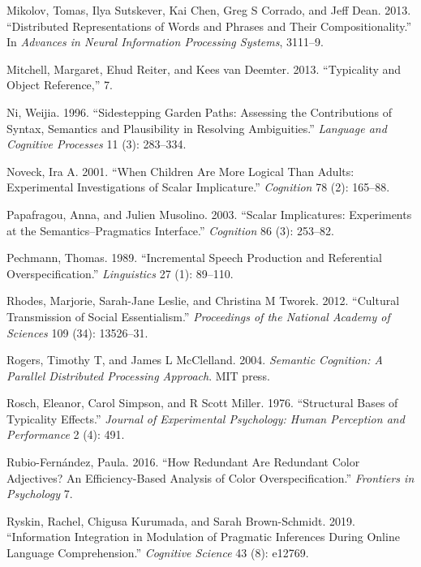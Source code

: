 \documentclass{ucetd}
\newlength{\cslhangindent}
\newenvironment{cslreferences}%
{\setlength{\parindent}{0pt}%
\everypar{\setlength{\hangindent}{\cslhangindent}}\ignorespaces}%
{\par}
\begin{document}
\begin{cslreferences}
\leavevmode\hypertarget{ref-mikolov2013}{}%
Mikolov, Tomas, Ilya Sutskever, Kai Chen, Greg S Corrado, and Jeff Dean.
2013. ``Distributed Representations of Words and Phrases and Their
Compositionality.'' In \emph{Advances in Neural Information Processing
Systems}, 3111--9.

\leavevmode\hypertarget{ref-mitchell_2013}{}%
Mitchell, Margaret, Ehud Reiter, and Kees van Deemter. 2013.
``Typicality and Object Reference,'' 7.

\leavevmode\hypertarget{ref-nietal}{}%
Ni, Weijia. 1996. ``Sidestepping Garden Paths: Assessing the
Contributions of Syntax, Semantics and Plausibility in Resolving
Ambiguities.'' \emph{Language and Cognitive Processes} 11 (3): 283--334.

\leavevmode\hypertarget{ref-noveck_when_2001}{}%
Noveck, Ira A. 2001. ``When Children Are More Logical Than Adults:
Experimental Investigations of Scalar Implicature.'' \emph{Cognition} 78
(2): 165--88.

\leavevmode\hypertarget{ref-papafragou_scalar_2003}{}%
Papafragou, Anna, and Julien Musolino. 2003. ``Scalar Implicatures:
Experiments at the Semantics--Pragmatics Interface.'' \emph{Cognition}
86 (3): 253--82.

\leavevmode\hypertarget{ref-pechmann_incremental_1989}{}%
Pechmann, Thomas. 1989. ``Incremental Speech Production and Referential
Overspecification.'' \emph{Linguistics} 27 (1): 89--110.

\leavevmode\hypertarget{ref-rhodes2012}{}%
Rhodes, Marjorie, Sarah-Jane Leslie, and Christina M Tworek. 2012.
``Cultural Transmission of Social Essentialism.'' \emph{Proceedings of
the National Academy of Sciences} 109 (34): 13526--31.

\leavevmode\hypertarget{ref-rogers2004}{}%
Rogers, Timothy T, and James L McClelland. 2004. \emph{Semantic
Cognition: A Parallel Distributed Processing Approach}. MIT press.

\leavevmode\hypertarget{ref-rosch_structural_1976}{}%
Rosch, Eleanor, Carol Simpson, and R Scott Miller. 1976. ``Structural
Bases of Typicality Effects.'' \emph{Journal of Experimental Psychology:
Human Perception and Performance} 2 (4): 491.

\leavevmode\hypertarget{ref-rubio-fernandez_how_2016}{}%
Rubio-Fernández, Paula. 2016. ``How Redundant Are Redundant Color
Adjectives? An Efficiency-Based Analysis of Color Overspecification.''
\emph{Frontiers in Psychology} 7.

\leavevmode\hypertarget{ref-ryskin2019information}{}%
Ryskin, Rachel, Chigusa Kurumada, and Sarah Brown-Schmidt. 2019.
``Information Integration in Modulation of Pragmatic Inferences During
Online Language Comprehension.'' \emph{Cognitive Science} 43 (8):
e12769.


\end{cslreferences}
\end{document}

